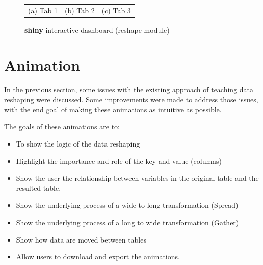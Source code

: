 \begin{figure}[H]
\begin{tabular}{ccc}
    (a) Tab 1 & (b) Tab 2 & (c) Tab 3 \\[6pt]
    \end{tabular}
    \caption{\textbf{shiny} interactive dashboard (reshape module)}
    \label{fig:reshapeshiny}
\end{figure}

\section{Animation}

In the previous section, some issues with the existing approach of teaching data reshaping were discussed. Some improvements were made to address those issues, with the end goal of making these animations as intuitive as possible. 

The goals of these animations are to:

\begin{itemize}
    \item To show the logic of the data reshaping
    \item Highlight the importance and role of the key and value (columns)
    \item Show the user the relationship between variables in the original table and the resulted table.
    \item Show the underlying process of a wide to long transformation (Spread)
    \item Show the underlying process of a long to wide transformation (Gather)
    \item Show how data are moved between tables
    \item Allow users to download and export the animations.
\end{itemize}